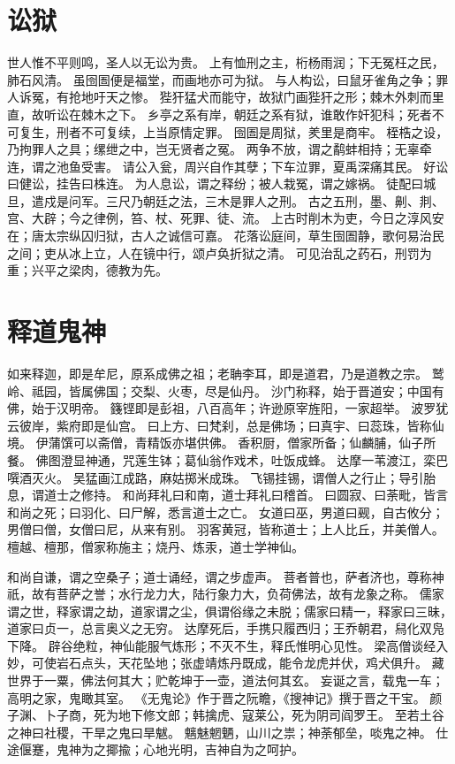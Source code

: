 \documentclass[12pt,UTF8]{ctexbook}
\begin{document}
\chapter{讼狱}

世人惟不平则鸣，圣人以无讼为贵。
上有恤刑之主，桁杨雨润；下无冤枉之民，肺石风清。
虽囹圄便是福堂，而画地亦可为狱。
与人构讼，曰鼠牙雀角之争；罪人诉冤，有抢地吁天之惨。
狴犴猛犬而能守，故狱门画狴犴之形；棘木外刺而里直，故听讼在棘木之下。
乡亭之系有岸，朝廷之系有狱，谁敢作奸犯科；死者不可复生，刑者不可复续，上当原情定罪。
囹圄是周狱，羑里是商牢。
桎梏之设，乃拘罪人之具；缧绁之中，岂无贤者之冤。
两争不放，谓之鹬蚌相持；无辜牵连，谓之池鱼受害。
请公入瓮，周兴自作其孽；下车泣罪，夏禹深痛其民。
好讼曰健讼，挂告曰株连。
为人息讼，谓之释纷；被人栽冤，谓之嫁祸。
徒配曰城旦，遣戍是问军。三尺乃朝廷之法，三木是罪人之刑。
古之五刑，墨、劓、剕、宫、大辟；今之律例，笞、杖、死罪、徒、流。
上古时削木为吏，今日之淳风安在；唐太宗纵囚归狱，古人之诚信可嘉。
花落讼庭间，草生囹圄静，歌何易治民之间；吏从冰上立，人在镜中行，颂卢奂折狱之清。
可见治乱之药石，刑罚为重；兴平之梁肉，德教为先。

\chapter{释道鬼神}

如来释迦，即是牟尼，原系成佛之祖；老聃李耳，即是道君，乃是道教之宗。
鹫岭、祗园，皆属佛国；交梨、火枣，尽是仙丹。
沙门称释，始于晋道安；中国有佛，始于汉明帝。
籛铿即是彭祖，八百高年；许逊原宰旌阳，一家超举。
波罗犹云彼岸，紫府即是仙宫。
曰上方、曰梵刹，总是佛场；曰真宇、曰蕊珠，皆称仙境。
伊蒲馔可以斋僧，青精饭亦堪供佛。
香积厨，僧家所备；仙麟脯，仙子所餐。
佛图澄显神通，咒莲生钵；葛仙翁作戏术，吐饭成蜂。
达摩一苇渡江，栾巴噀酒灭火。
吴猛画江成路，麻姑掷米成珠。
飞锡挂锡，谓僧人之行止；导引胎息，谓道士之修持。
和尚拜礼曰和南，道士拜礼曰稽首。
曰圆寂、曰荼毗，皆言和尚之死；曰羽化、曰尸解，悉言道士之亡。
女道曰巫，男道曰觋，自古攸分；男僧曰僧，女僧曰尼，从来有别。
羽客黄冠，皆称道士；上人比丘，并美僧人。
檀越、檀那，僧家称施主；烧丹、炼汞，道士学神仙。

和尚自谦，谓之空桑子；道士诵经，谓之步虚声。
菩者普也，萨者济也，尊称神祇，故有菩萨之誉；水行龙力大，陆行象力大，负荷佛法，故有龙象之称。
儒家谓之世，释家谓之劫，道家谓之尘，俱谓俗缘之未脱；儒家曰精一，释家曰三昧，道家曰贞一，总言奥义之无穷。
达摩死后，手携只履西归；王乔朝君，舄化双凫下降。
辟谷绝粒，神仙能服气炼形；不灭不生，释氏惟明心见性。
梁高僧谈经入妙，可使岩石点头，天花坠地；张虚靖炼丹既成，能令龙虎并伏，鸡犬俱升。
藏世界于一粟，佛法何其大；贮乾坤于一壶，道法何其玄。
妄诞之言，载鬼一车；高明之家，鬼瞰其室。
《无鬼论》作于晋之阮瞻，《搜神记》撰于晋之干宝。
颜子渊、卜子商，死为地下修文郎；韩擒虎、寇莱公，死为阴司阎罗王。
至若土谷之神曰社稷，干旱之鬼曰旱魃。
魑魅魍魉，山川之祟；神荼郁垒，啖鬼之神。
仕途偃蹇，鬼神为之揶揄；心地光明，吉神自为之呵护。
\end{document}
